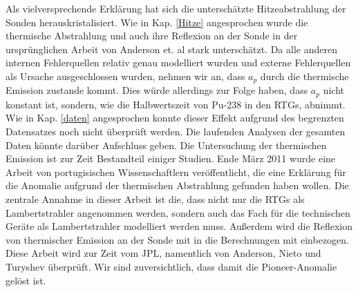 \bigskip

Als vielversprechende Erklärung hat sich die unterschätzte Hitzeabstrahlung der Sonden herauskristalisiert. Wie in Kap. \ref{Hitze} angesprochen wurde die thermische Abstrahlung und auch ihre Reflexion an der Sonde in der ursprünglichen Arbeit von Anderson et. al \cite{Anderson2002} stark unterschätzt. Da alle anderen internen Fehlerquellen relativ genau modelliert wurden und externe Fehlerquellen als Ursache ausgeschlossen wurden, nehmen wir an, dass $a_p$ durch die thermische Emission zustande kommt. Dies würde allerdings zur Folge haben, dass $a_p$ nicht konstant ist, sondern, wie die Halbwertszeit von Pu-238 in den RTGs, abnimmt. Wie in Kap. \ref{daten} angesprochen konnte dieser Effekt aufgrund des begrenzten Datensatzes noch nicht überprüft werden. Die laufenden Analysen der gesamten Daten könnte darüber Aufschluss geben. Die Untersuchung der thermischen Emission ist zur Zeit Bestandteil einiger Studien. Ende März 2011 wurde eine Arbeit von portugisischen Wissenschaftlern veröffentlicht\cite{port2011}, die eine Erklärung für die Anomalie aufgrund der thermischen Abstrahlung gefunden haben wollen. Die zentrale Annahme in dieser Arbeit ist die, dass nicht nur die RTGs als Lambertstrahler angenommen werden, sondern auch das Fach für die technischen Geräte als Lambertstrahler modelliert werden muss. Außerdem wird die Reflexion von thermischer Emission an der Sonde mit in die Berechnungen mit einbezogen. Diese Arbeit wird zur Zeit vom JPL, namentlich von Anderson, Nieto und Turyshev überprüft. Wir sind zuversichtlich, dass damit die Pioneer-Anomalie gelöst ist.
